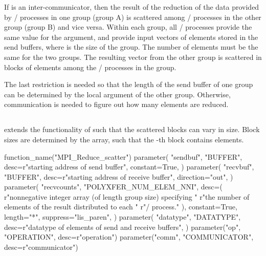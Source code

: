 If  is an inter-communicator, then the result of the reduction of the data provided
by \MPI/ processes in one group (group A) is scattered among \MPI/ processes in the other group (group B) and vice versa.
Within each group, all \MPI/ processes provide the same value for the  argument,
and provide input vectors of  elements stored in the send buffers,
where  is the size of the group.
The number of elements  must be the same for the two groups.
The resulting vector from the other group is scattered in blocks of 
elements among the \MPI/ processes in the group.

\begin{rationale}
The last restriction is needed so that the length of the send buffer of one group can be
determined by the local  argument of the other group.
Otherwise, communication is needed to figure out how many elements are reduced.
\end{rationale}


\subsection{\texorpdfstring{}{MPI\_REDUCE\_SCATTER}}
\label{subsec:coll-reduce-scatter} %

 extends the functionality of 
such that the scattered blocks can vary in size.
Block sizes are determined by the  array,
such that the -th block contains  elements.

%
\begin{mpi-binding}
    function_name("MPI_Reduce_scatter")
    parameter(
        "sendbuf",
        "BUFFER",
        desc=r"starting address of send buffer",
        constant=True,
    )
    parameter(
        "recvbuf",
        "BUFFER",
        desc=r"starting address of receive buffer",
        direction="out",
    )
    parameter(
        "recvcounts",
        "POLYXFER_NUM_ELEM_NNI",
        desc=(
            r"nonnegative integer array (of length group size) specifying "
            r"the number of elements of the result distributed to each "
            r"\MPI/ process."
        ),
        constant=True,
        length="*",
        suppress="lis_paren",
    )
    parameter(
        "datatype",
        "DATATYPE",
        desc=r"datatype of elements of send and receive buffers",
    )
    parameter("op", "OPERATION", desc=r"operation")
    parameter("comm", "COMMUNICATOR", desc=r"communicator")
\end{mpi-binding}

